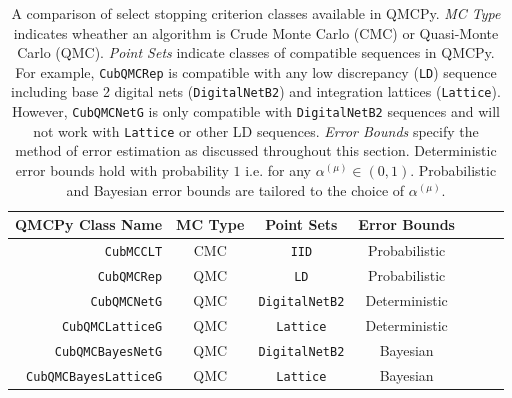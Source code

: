 \documentclass[graybox]{svmult}
\begin{document}
\begin{table}[t]
\centering
\begin{tabular}{r c c c c c c}
    QMCPy Class Name & MC Type & Point Sets & Error Bounds \\
    \hline
    \texttt{CubMCCLT} \cite{cubmcg} & CMC & \texttt{IID} & Probabilistic \\
    \texttt{CubQMCRep} \cite{mcbook} & QMC & \texttt{LD} & Probabilistic \\
    \texttt{CubQMCNetG} \cite{cubqmcsobol} & QMC & \texttt{DigitalNetB2} & Deterministic \\
    \texttt{CubQMCLatticeG} \cite{cubqmclattice} & QMC & \texttt{Lattice} & Deterministic \\
    \texttt{CubQMCBayesNetG} \cite{cubqmcbayes_thesis} & QMC &  \texttt{DigitalNetB2} & Bayesian \\
    \texttt{CubQMCBayesLatticeG} \cite{cubqmcbayeslattice} & QMC & \texttt{Lattice} & Bayesian \\
    \hline
\end{tabular}
\caption{A comparison of select stopping criterion classes available in QMCPy. \emph{MC Type} indicates wheather an algorithm is Crude Monte Carlo (CMC) or Quasi-Monte Carlo (QMC). \emph{Point Sets} indicate classes of compatible sequences in QMCPy. For example, \texttt{CubQMCRep} is compatible with any low discrepancy (\texttt{LD}) sequence including base 2 digital nets (\texttt{DigitalNetB2}) and integration lattices (\texttt{Lattice}). However, \texttt{CubQMCNetG} is only compatible with \texttt{DigitalNetB2} sequences and will not work with \texttt{Lattice} or other LD sequences. \emph{Error Bounds} specify the method of error estimation as discussed throughout this section. Deterministic error bounds hold with probability $1$ i.e. for any $\alpha^{(\mu)} \in (0,1)$. Probabilistic and Bayesian error bounds are tailored to the choice of $\alpha^{(\mu)}$.}
\label{table:qmcpy_sc}
\end{table}
\end{document}
